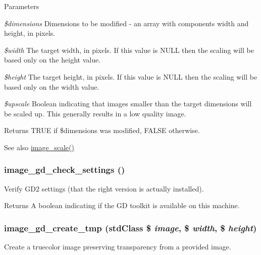 \begin{DoxyParams}{Parameters}
\item[{\em \$dimensions}]Dimensions to be modified -\/ an array with components width and height, in pixels. \item[{\em \$width}]The target width, in pixels. If this value is NULL then the scaling will be based only on the height value. \item[{\em \$height}]The target height, in pixels. If this value is NULL then the scaling will be based only on the width value. \item[{\em \$upscale}]Boolean indicating that images smaller than the target dimensions will be scaled up. This generally results in a low quality image.\end{DoxyParams}
\begin{DoxyReturn}{Returns}
TRUE if \$dimensions was modified, FALSE otherwise.
\end{DoxyReturn}
\begin{DoxySeeAlso}{See also}
\hyperlink{group__image_ga2eac147bb70d14d9439d6b0d54023ce3}{image\_\-scale()} 
\end{DoxySeeAlso}
\hypertarget{group__image_ga1926e8b1932480b81427c1301e8eb4dc}{
\subsubsection[{image\_\-gd\_\-check\_\-settings}]{\setlength{\rightskip}{0pt plus 5cm}image\_\-gd\_\-check\_\-settings ()}}
\label{group__image_ga1926e8b1932480b81427c1301e8eb4dc}
Verify GD2 settings (that the right version is actually installed).

\begin{DoxyReturn}{Returns}
A boolean indicating if the GD toolkit is available on this machine. 
\end{DoxyReturn}
\hypertarget{group__image_gabb63f813bf7d644843d7fc9024b6e1ea}{
\subsubsection[{image\_\-gd\_\-create\_\-tmp}]{\setlength{\rightskip}{0pt plus 5cm}image\_\-gd\_\-create\_\-tmp (stdClass \$ {\em image}, \/  \$ {\em width}, \/  \$ {\em height})}}
\label{group__image_gabb63f813bf7d644843d7fc9024b6e1ea}
Create a truecolor image preserving transparency from a provided image.


